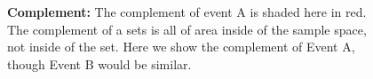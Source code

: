 \documentclass[
  letterpaper,
  DIV=11,
  numbers=noendperiod]{scrreprt}
\theoremstyle{definition}
\theoremstyle{definition}
\theoremstyle{definition}
\theoremstyle{remark}
\begin{document}
\begin{figure}[H]

\caption{\label{fig-venn-diagram-complement}\textbf{Complement:} The
complement of event A is shaded here in red. The complement of a sets is
all of area inside of the sample space, not inside of the set. Here we
show the complement of Event A, though Event B would be similar.}


\end{figure}%

\newpage{}
\end{document}
